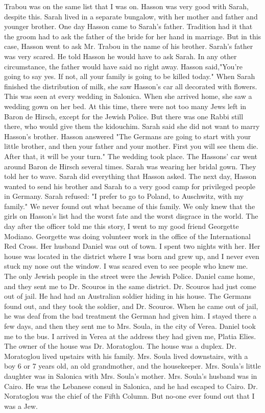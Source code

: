 Trabou was on the same list that I was on. Hasson was very good with 
Sarah, despite this. 
Sarah lived in a separate bungalow, with her mother and father and 
younger brother. One day Hasson came to Sarah's father. Tradition had 
it that the groom had to ask the father of the bride for her hand in 
marriage. But in this case, Hasson went to ask Mr. Trabou in the name 
of his brother. Sarah's father was very scared. He told Hasson he
would have to ask Sarah. In any other circumstance, the father would 
have said no right away. Hasson said,"You're going to say yes. If not, 
all your family is going to be killed today." 
When Sarah finished the distribution of milk, she saw Hasson's car 
all decorated with flowers. This was seen at every wedding in Salonica. 
When she arrived home, she saw a wedding gown on her bed. At this time, 
there were not too many Jews left in Baron de Hirsch, except for the 
Jewish Police. But there was one Rabbi still there, who would 
give them the kidouchim. Sarah said she did not want to marry Hasson's 
brother. Hasson answered "The Germans are going to start with your 
little brother, and then your father and your mother. First you will 
see them die. After that, it will be your turn." The wedding took place. 
The Hassons' car went around Baron de Hirsch several times. Sarah 
was wearing her bridal gown. They told her to wave. Sarah did everything that Hasson asked. The next day, Hasson wanted to send his brother and Sarah to a very good camp for privileged people in Germany. 
Sarah refused: "I prefer to go to Poland, to Auschwitz, with my family." 
We never found out what became of this family. We only knew that the 
girls on Hasson's list had the worst fate and the worst disgrace in the 
world. 
The day after the officer told me this story, I went to my good 
friend Georgette Modiano. Georgette was doing volunteer work in the 
office of the International Red Cross. Her husband Daniel was out of 
town. I spent two nights with her. Her house was located in the district 
where I was born and grew up, and I never even stuck my nose out 
the window. I was scared even to see people who knew me. The only 
Jewish people in the street were the Jewish Police. 
Daniel came home, and they sent me to Dr. Scouros in the same district. 
Dr. Scouros had just come out of jail. He had had an Australian soldier hiding in his house. The Germans found out, and they took the soldier, and Dr. Scouros. When he came out of jail, he was deaf from the bad treatment the German had given him. 
I stayed there a few days, and then they sent me to Mrs. Soula, in 
the city of Verea. Daniel took me to the bus. I arrived in Verea at 
the address they had given me, Platia Elies. The owner of the house 
was Dr. Moratoglou. The house was a duplex. Dr. Moratoglou lived upstairs with his family. Mrs. Soula lived downstairs, with a boy 6 or 7 years old, an old grandmother, and the housekeeper. Mrs. Soula's little daughter was in Salonica with Mrs. Soula's mother. Mrs. Soula's husband 
was in Cairo. He was the Lebanese consul in Salonica, and he had escaped to Cairo. Dr. Noratoglou was the chief of the Fifth Column. But no-one ever found out that I was a Jew. 

